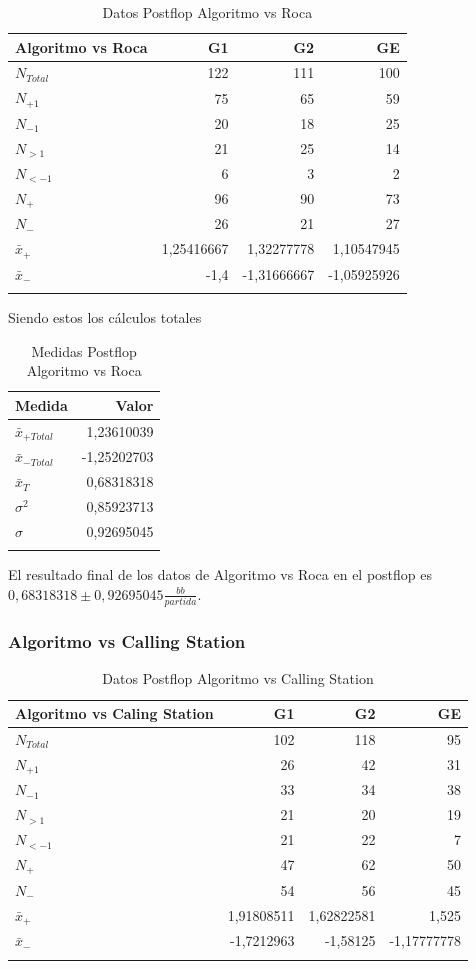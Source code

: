 \begin{longtable}[c]{lrrr}
\hline 
Algoritmo vs Roca & G1 & G2 & GE \\ \hline
$N_{Total}$& 122 & 111 & 100 \\
$N_{+1}$& 75 & 65 & 59 \\
$N_{-1}$ & 20 & 18 & 25 \\
$N_{>1}$& 21 & 25 & 14 \\
$N_{<-1}$& 6 & 3 & 2 \\
$N_{+}$& 96 & 90 & 73 \\
$N_{-}$& 26 & 21 & 27 \\ \hline
$\bar{x}_+$ & 1,25416667 & 1,32277778 & 1,10547945 \\
$\bar{x}_-$& -1,4 & -1,31666667 & -1,05925926 \\ \hline
\caption{Datos Postflop Algoritmo vs Roca}
\label{tab:DPFAvR}
\end{longtable}

Siendo estos los cálculos totales

\begin{longtable}[c]{lr}
\hline 
Medida & Valor \\ \hline 
$\bar{x}_{+Total}$ & 1,23610039 \\
$\bar{x}_{-Total}$ & -1,25202703 \\
$\bar{x}_T$ & 0,68318318 \\
$\sigma^2$ & 0,85923713 \\
$\sigma$ & 0,92695045 \\  \hline
\caption{Medidas Postflop Algoritmo vs Roca}
\label{tab:MPFAvR}
\end{longtable}


El resultado final de los datos de Algoritmo vs Roca en el postflop es  $ 0,68318318\pm 0,92695045 $$\frac{bb}{partida}$.

\vspace{5mm} %

\subsubsection{Algoritmo vs Calling Station}

\begin{longtable}[c]{lrrr}
\hline 
Algoritmo vs Caling Station & G1 & G2 & GE \\ \hline
$N_{Total}$& 102 & 118 & 95 \\
$N_{+1}$& 26 & 42 & 31 \\
$N_{-1}$ & 33 & 34 & 38 \\
$N_{>1}$& 21 & 20 & 19 \\
$N_{<-1}$& 21 & 22 & 7 \\
$N_{+}$& 47 & 62 & 50 \\
$N_{-}$& 54 & 56 & 45 \\ \hline
$\bar{x}_+$ & 1,91808511 & 1,62822581 & 1,525 \\
$\bar{x}_-$& -1,7212963 & -1,58125 & -1,17777778 \\ \hline
\caption{Datos Postflop Algoritmo vs Calling Station}
\label{tab:DPFAvC}
\end{longtable}

